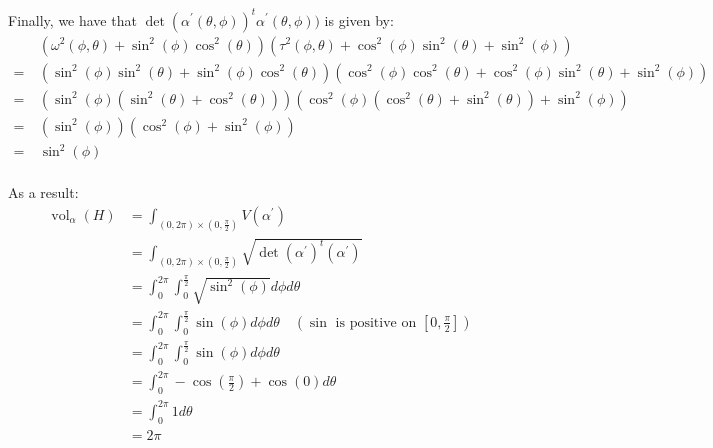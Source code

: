 \documentclass{article}
\begin{document}
\begin{soln}[source=Alan]
Finally, we have that $ \det(\alpha^\prime(\theta, \phi))^t\alpha^\prime(\theta, \phi)) $
is given by:
\begin{align*}
    & \ (\omega^{2}(\phi, \theta) + \sin^{2}(\phi)\cos^{2}(\theta))
    (\tau^{2}(\phi, \theta)+\cos^{2}(\phi)\sin^{2}(\theta)+\sin^{2}(\phi)) \\
= & \ (\sin^2(\phi)\sin^2(\theta) + \sin^2(\phi)\cos^2(\theta))(\cos^2(\phi)\cos^2(\theta) +
\cos^2(\phi)\sin^2(\theta) + \sin^2(\phi)) \\
 = & \ (\sin^2(\phi)(\sin^2(\theta) + \cos^2(\theta)))(\cos^2(\phi)(\cos^2(\theta) + \sin^2(\theta))
 + \sin^2(\phi)) \\
 = & \ (\sin^2(\phi))(\cos^2(\phi) + \sin^2(\phi)) \\
 = & \ \sin^2(\phi) \\
\end{align*}

As a result:
\begin{align*}
\operatorname{vol}_\alpha(H) &= \int_{(0, 2\pi) \times (0, \frac{\pi}{2})} V(\alpha^\prime) \\
 &= \int_{(0, 2\pi) \times (0, \frac{\pi}{2})} \sqrt{ \det (\alpha^\prime)^t(\alpha^\prime)  } \\
 &= \int_{0}^{2\pi} \int_0^{\frac{\pi}{2}} \sqrt{ \sin^2(\phi)  }   d\phi d\theta \\
 &= \int_{0}^{2\pi} \int_0^{\frac{\pi}{2}} \sin(\phi)  d\phi d\theta \quad \left(\sin \text{ is
 positive on } \left[0, \frac{\pi}{2}\right]\right) \\
 &= \int_{0}^{2\pi} \int_0^{\frac{\pi}{2}} \sin(\phi)  d\phi d\theta \\
 &= \int_{0}^{2\pi} -\cos(\frac{\pi}{2}) + \cos(0)  d\theta \\
 &= \int_{0}^{2\pi} 1  d\theta \\
 &= 2\pi \\
\end{align*}
\end{soln}
\end{document}
